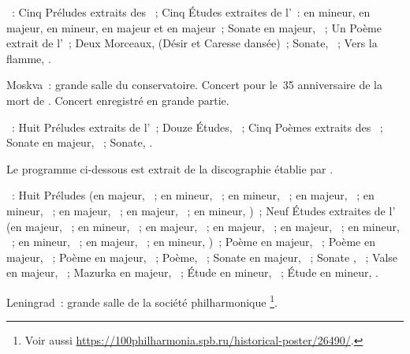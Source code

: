 \begin{description}
 \textsc{\Scriabine{}}~: Cinq Préludes extraits des ~; Cinq Études extraites de l'~:  en \kF \Sharp
 mineur,  en \kF \Sharp majeur,  en \kC \Sharp mineur,
  en \kD \Flat majeur et  en \kE \Flat majeur~; Sonate
 en \kF \Sharp majeur, ~; Un Poème extrait de l'~; Deux
 Morceaux,  (Désir et Caresse dansée)~; Sonate, ~; Vers la
 flamme, .
 \item[\DateWithWeekDay{1950-05-19}]
 Moskva~: grande salle du conservatoire.
 Concert pour le~35\ieme{} anniversaire de la mort de \Scriabine{}.
 Concert enregistré en grande partie.

 \textsc{\Scriabine{}}~: Huit Préludes extraits de l'~; Douze
 Études, ~; Cinq Poèmes extraits des ~; Sonate en \kF \Sharp majeur, ~; Sonate, .

 Le programme ci-dessous est extrait de la discographie établie par
 \citet[p.~29]{Nikonovich11} \citep[voir aussi][p.~392]{Scriabine}.

 \textsc{\Scriabine{}}~: Huit Préludes (en \kC majeur, 
 ~; en \kA mineur,  ~; en \kE mineur, 
 ~; en \kD majeur,  ~; en \kC \Sharp mineur,
  ~; en \kA \Flat majeur,  ~; en
 \kE \Flat majeur,  ~; en \kC mineur, 
 )~; Neuf Études extraites de l' (en \kC \Sharp majeur,
 ~; en \kF \Sharp mineur, ~; en \kB majeur, ~;
 en \kE majeur, ~; en \kA \Flat majeur, ~; en \kB \Flat
 mineur, ~; en \kG \Sharp mineur, ~; en \kD \Flat
 majeur, ~; en \kD \Sharp mineur, )~; Poème en \kD
 majeur,  ~; Poème en \kF \Sharp majeur, 
 ~; Poème en \kC majeur,  ~; Poème, 
 ~; Sonate  en \kF \Sharp majeur, ~; Sonate
 , ~; Valse en \kA \Flat majeur, ~; Mazurka en
 \kF \Sharp majeur,  ~; Étude en \kC \Sharp mineur,
  ~; Étude en \kD \Sharp mineur,  .
 \item[\DateWithWeekDay{1950-06-02}]
 Leningrad~: grande salle de la société philharmonique%
 \footnote{Voir aussi
 \href{https://100philharmonia.spb.ru/historical-poster/26490/}%
 {https://100philharmonia.spb.ru/historical-poster/26490/}.}.


\end{description}
